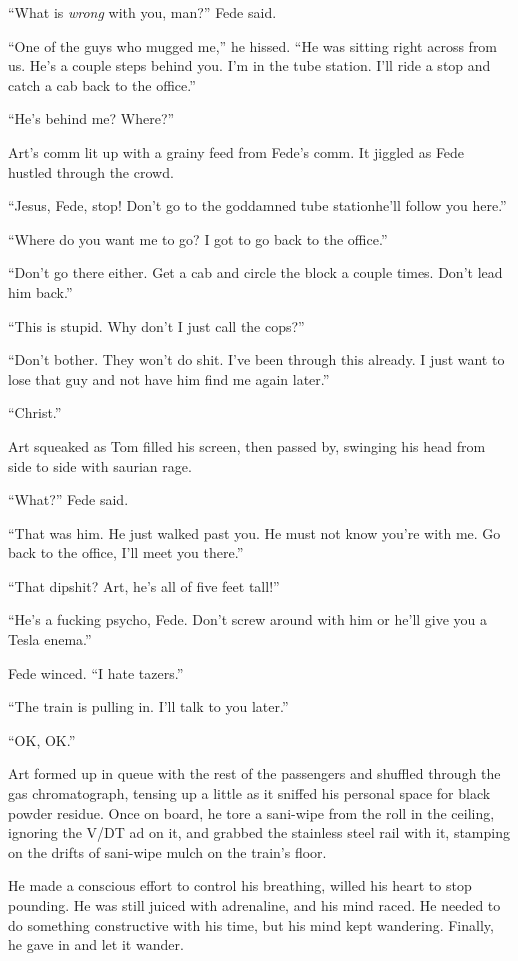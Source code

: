 “What is \emph{wrong} with you, man?” Fede said.

“One of the guys who mugged me,” he hissed. “He was sitting right
across from us. He’s a couple steps behind you. I’m in the tube
station. I’ll ride a stop and catch a cab back to the office.”

“He’s behind me? Where?”

Art’s comm lit up with a grainy feed from Fede’s comm. It jiggled
as Fede hustled through the crowd.

“Jesus, Fede, stop! Don’t go to the goddamned tube station{\dash}he’ll
follow you here.”

“Where do you want me to go? I got to go back to the office.”

“Don’t go there either. Get a cab and circle the block a couple
times. Don’t lead him back.”

“This is stupid. Why don’t I just call the cops?”

“Don’t bother. They won’t do shit. I’ve been through this already.
I just want to lose that guy and not have him find me again
later.”

“Christ.”

Art squeaked as Tom filled his screen, then passed by, swinging his
head from side to side with saurian rage.

“What?” Fede said.

“That was him. He just walked past you. He must not know you’re
with me. Go back to the office, I’ll meet you there.”

“That dipshit? Art, he’s all of five feet tall!”

“He’s a fucking psycho, Fede. Don’t screw around with him or he’ll
give you a Tesla enema.”

Fede winced. “I hate tazers.”

“The train is pulling in. I’ll talk to you later.”

“OK, OK.”

Art formed up in queue with the rest of the passengers and shuffled
through the gas chromatograph, tensing up a little as it sniffed
his personal space for black powder residue. Once on board, he tore
a sani-wipe from the roll in the ceiling, ignoring the V/DT ad on
it, and grabbed the stainless steel rail with it, stamping on the
drifts of sani-wipe mulch on the train’s floor.

He made a conscious effort to control his breathing, willed his
heart to stop pounding. He was still juiced with adrenaline, and
his mind raced. He needed to do something constructive with his
time, but his mind kept wandering. Finally, he gave in and let it
wander.

